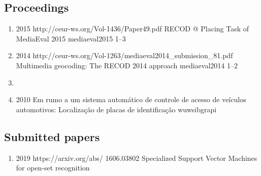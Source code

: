 \subsection*{Proceedings}

\begin{enumerate}[resume]
\item{}
  {
  }
  {2015}
  {http://ceur-ws.org/Vol-1436/Paper49.pdf}
  {RECOD @ Placing Task of MediaEval 2015}
  {mediaeval2015}
  {1--3}
  {}
\item{}
  {
  }
  {2014}
  {http://ceur-ws.org/Vol-1263/mediaeval2014_submission_81.pdf}
  {Multimedia geocoding: The RECOD 2014 approach}
  {mediaeval2014}
  {1--2}
  {}
\item{}
\item{}
  {
  }
  {2010}
  {}
  {Em rumo a um sistema automático de controle de acesso de veículos automotivos: Localização de placas de identificação}
  {wuwsibgrapi}
  {}
  {}
\end{enumerate}

\subsection*{Submitted papers}

\begin{enumerate}[resume]
\item{}
  {
  }
  {2019}
  {https://arxiv.org/abs/}
  {1606.03802}
  {Specialized Support Vector Machines for open-set recognition}
  {}
\end{enumerate}

